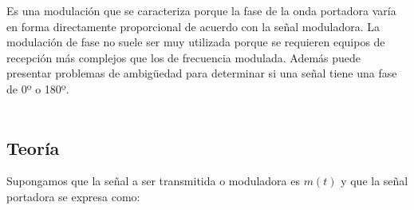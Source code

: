 \documentclass[a4paper]{article}
\begin{document}
Es una modulación que se caracteriza porque la fase de la onda portadora varía en forma directamente proporcional de acuerdo con la señal moduladora. La modulación de fase no suele ser muy utilizada porque se requieren equipos de recepción más complejos que los de frecuencia modulada. Además puede presentar problemas de ambigüedad para determinar si una señal tiene una fase de 0º o 180º.
\\
\\
\noindent{}

\subsection{Teoría}

Supongamos que la señal a ser transmitida o moduladora es $\scriptstyle m(t)$ y que la señal portadora se expresa como:
\end{document}
